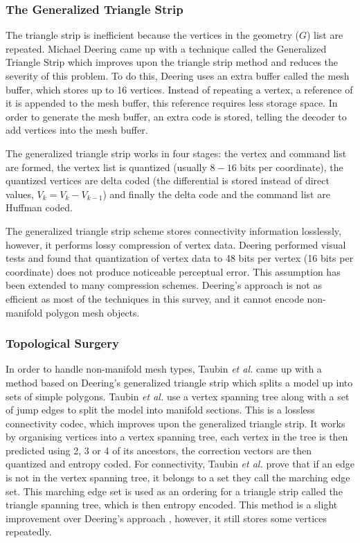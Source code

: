 \subsubsection{The Generalized Triangle Strip}

The triangle strip is inefficient because the vertices in the geometry ($G$) list are repeated. Michael Deering \cite{Deering95Geometry} came up with a technique called the Generalized Triangle Strip which improves upon the triangle strip method and reduces the severity of this problem. To do this, Deering uses an extra buffer called the mesh buffer, which stores up to 16 vertices. Instead of repeating a vertex, a reference of it is appended to the mesh buffer, this reference requires less storage space. In order to generate the mesh buffer, an extra code is stored, telling the decoder to add vertices into the mesh buffer.

The generalized triangle strip works in four stages: the vertex and command list are formed, the vertex list is quantized (usually $8-16$ bits per coordinate), the quantized vertices are delta coded (the differential is stored instead of direct values, $V_k = V_k - V_{k-1}$) and finally the delta code and the command list are Huffman coded. 

The generalized triangle strip scheme stores connectivity information losslessly, however, it performs lossy compression of vertex data. Deering performed visual tests and found that quantization of vertex data to 48 bits per vertex (16 bits per coordinate) does not produce noticeable perceptual error. This assumption has been extended to many compression schemes. Deering's approach is not as efficient as most of the techniques in this survey, and it cannot encode non-manifold polygon mesh objects.

\subsubsection{Topological Surgery}

In order to handle non-manifold mesh types, Taubin \textit{et al.} \cite{Taubin98Geometric} came up with a method based on Deering's generalized triangle strip which splits a model up into sets of simple polygons. Taubin \textit{et al.} use a vertex spanning tree along with a set of jump edges to split the model into manifold sections. This is a lossless connectivity codec, which improves upon the generalized triangle strip. It works by organising vertices into a vertex spanning tree, each vertex in the tree is then predicted using 2, 3 or 4 of its ancestors, the correction vectors are then quantized and entropy coded. For connectivity, Taubin \textit{et al.} prove that if an edge is not in the vertex spanning tree, it belongs to a set they call the marching edge set. This marching edge set is used as an ordering for a triangle strip called the triangle spanning tree, which is then entropy encoded. This method is a slight improvement over Deering's approach \cite{Deering95Geometry}, however, it still stores some vertices repeatedly.

